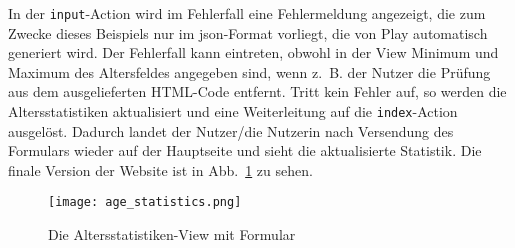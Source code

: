 In der \lstinline|input|-Action wird im Fehlerfall eine Fehlermeldung angezeigt, die zum Zwecke dieses Beispiels nur im \gls{json}-Format vorliegt, die von Play automatisch generiert wird.
Der Fehlerfall kann eintreten, obwohl in der View Minimum und Maximum des Altersfeldes angegeben sind, wenn z.~B. der Nutzer die Prüfung aus dem ausgelieferten HTML-Code entfernt.
Tritt kein Fehler auf, so werden die Altersstatistiken aktualisiert und eine Weiterleitung auf die \lstinline|index|-Action ausgelöst.
Dadurch landet der Nutzer/die Nutzerin nach Versendung des Formulars wieder auf der Hauptseite und sieht die aktualisierte Statistik.
Die finale Version der Website ist in Abb.~\ref{fig:die_altersstatistiken_view_mit_formular} zu sehen.

\begin{figure}
\centering
\texttt{[image: age\_statistics.png]}
\caption{Die Altersstatistiken-View mit Formular}
\label{fig:die_altersstatistiken_view_mit_formular}
\end{figure}




